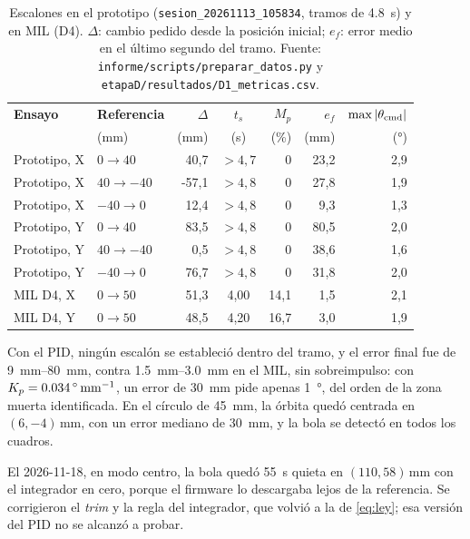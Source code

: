 \begin{table}[!t]
\caption{Escalones en el prototipo (\texttt{sesion\_20261113\_105834}, tramos de
\SI{4.8}{\second}) y en MIL (D4). $\Delta$: cambio pedido desde la posición inicial; $e_f$: error
medio en el último segundo del tramo. Fuente: \texttt{informe/scripts/preparar\_datos.py} y
\texttt{etapaD/resultados/D1\_metricas.csv}.}
\label{tab:exp}
\centering
\footnotesize
\setlength{\tabcolsep}{3pt}
\begin{tabular}{@{}llrcrrr@{}}
\toprule
\textbf{Ensayo} & \textbf{Referencia} & $\Delta$ & $t_s$ & $M_p$ & $e_f$ & $\max|\theta_{\mathrm{cmd}}|$ \\
 & (\si{\milli\metre}) & (\si{\milli\metre}) & (\si{\second}) & (\si{\percent}) & (\si{\milli\metre}) & (\si{\degree}) \\
\midrule
Prototipo, X & $0 \rightarrow 40$     & 40,7  & $> 4{,}7$ & 0 & 23,2 & 2,9 \\
Prototipo, X & $40 \rightarrow -40$   & -57,1 & $> 4{,}8$ & 0 & 27,8 & 1,9 \\
Prototipo, X & $-40 \rightarrow 0$    & 12,4  & $> 4{,}8$ & 0 & 9,3  & 1,3 \\
Prototipo, Y & $0 \rightarrow 40$     & 83,5  & $> 4{,}8$ & 0 & 80,5 & 2,0 \\
Prototipo, Y & $40 \rightarrow -40$   & 0,5   & $> 4{,}8$ & 0 & 38,6 & 1,6 \\
Prototipo, Y & $-40 \rightarrow 0$    & 76,7  & $> 4{,}8$ & 0 & 31,8 & 2,0 \\
\midrule
MIL D4, X & $0 \rightarrow 50$        & 51,3  & 4,00 & 14,1 & 1,5 & 2,1 \\
MIL D4, Y & $0 \rightarrow 50$        & 48,5  & 4,20 & 16,7 & 3,0 & 1,9 \\
\bottomrule
\end{tabular}
\end{table}

Con el PID, ningún escalón se estableció dentro del tramo, y el error final fue de
\SIrange{9}{80}{\milli\metre}, contra \SIrange{1.5}{3.0}{\milli\metre} en el MIL, sin sobreimpulso:
con $K_p = \SI{0.034}{\degree\per\milli\metre}$, un error de \SI{30}{\milli\metre} pide apenas
\SI{1}{\degree}, del orden de la zona muerta identificada. En el círculo de
\SI{45}{\milli\metre}, la órbita quedó centrada en $(6, -4)\,\si{\milli\metre}$, con un error
mediano de \SI{30}{\milli\metre}, y la bola se detectó en todos los cuadros.

El 2026-11-18, en modo centro, la bola quedó \SI{55}{\second} quieta en
$(110, 58)\,\si{\milli\metre}$ con el integrador en cero, porque el firmware lo descargaba lejos de
la referencia. Se corrigieron el \emph{trim} y la regla del integrador, que volvió a la de
\eqref{eq:ley}; esa versión del PID no se alcanzó a probar.

